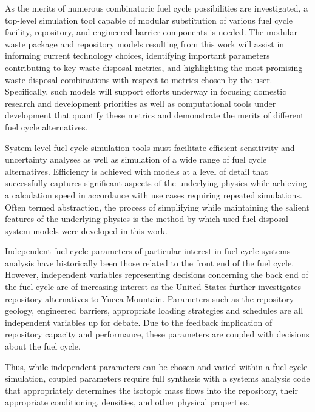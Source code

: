 As the merits of numerous combinatoric fuel cycle possibilities are 
investigated, a top-level simulation tool capable of modular substitution of 
various fuel cycle facility, repository, and engineered barrier components is 
needed. The modular waste package and repository models resulting from this work 
will assist in informing current technology choices, identifying important 
parameters contributing to key waste disposal metrics, and highlighting the most 
promising waste disposal combinations with respect to metrics chosen by
the user. Specifically, such models will support efforts underway in focusing 
domestic research and development priorities as well as computational tools 
under development that quantify these metrics and demonstrate the merits of 
different fuel cycle alternatives. 


System level fuel cycle simulation tools must facilitate efficient sensitivity 
and uncertainty analyses as well as simulation of a wide range of fuel cycle 
alternatives.  Efficiency is achieved with models at a level of detail that 
successfully captures significant aspects of the underlying physics while 
achieving a calculation speed in accordance with use cases requiring repeated 
simulations.
Often termed abstraction, the process of simplifying while 
maintaining the salient features of the underlying physics is the method by 
which used fuel disposal system models were developed in this work. 


Independent fuel cycle parameters of particular interest in fuel cycle systems 
analysis have historically been those related to the front end of the fuel cycle.
However, independent variables representing decisions concerning the back end
of the fuel cycle are of increasing interest as the United States further
investigates repository alternatives to Yucca Mountain.  Parameters such as the
repository geology, engineered barriers, appropriate loading strategies and
schedules are all independent variables up for debate. Due to the feedback 
implication of repository capacity and performance, these
parameters are coupled with decisions about the fuel cycle. 


Thus, while independent parameters can be chosen and varied within a fuel cycle 
simulation, coupled parameters require full synthesis with a systems analysis 
code that appropriately determines the isotopic mass flows into the repository, 
their appropriate conditioning, densities, and other physical properties.  

